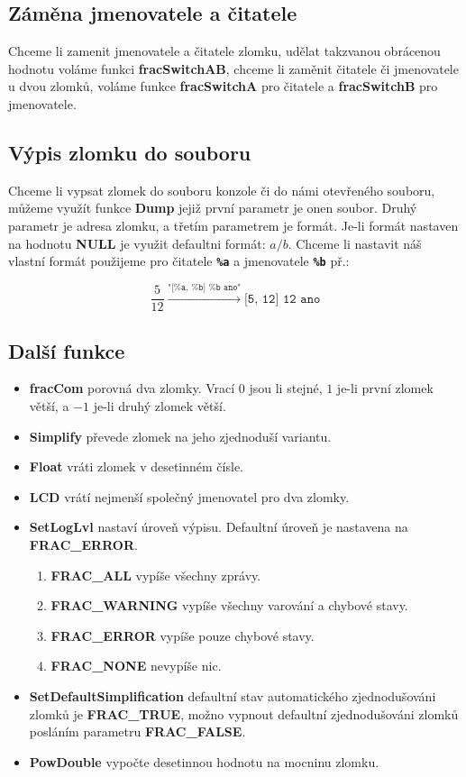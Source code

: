 \documentclass[a4paper, twocolumn, 11pt, twoside]{article}
\begin{document}
\subsection{Záměna jmenovatele a čitatele}
Chceme li zamenit jmenovatele a čitatele zlomku, udělat takzvanou obrácenou hodnotu
voláme funkci \textbf{fracSwitchAB}, chceme li zaměnit čitatele či jmenovatele u dvou zlomků, voláme 
funkce \textbf{fracSwitchA} pro čitatele a \textbf{fracSwitchB} pro jmenovatele.

\subsection{Výpis zlomku do souboru}
Chceme li vypsat zlomek do souboru konzole či do námi otevřeného souboru,
můžeme využít funkce \textbf{Dump} jejiž první parametr je onen soubor.
Druhý parametr je adresa zlomku, a třetím parametrem je formát. Je-li formát nastaven na hodnotu \textbf{NULL} je využit defaultni formát: $a/b$.
Chceme li nastavit náš vlastní formát použijeme pro čitatele \texttt{\textbf{\%a}} a jmenovatele \texttt{\textbf{\%b}} př.:

$$\frac{5}{12} \xrightarrow{\texttt{"[\%a, \%b] \%b ano"}} \texttt{[5, 12] 12 ano}$$

\subsection{Další funkce}
\begin{itemize}
    \item \textbf{fracCom} porovná dva zlomky. Vrací $0$ jsou li stejné, $1$ je-li první zlomek větší, a $-1$ je-li druhý zlomek větší.
    \item \textbf{Simplify} převede zlomek na jeho zjednoduší variantu.
    \item \textbf{Float} vráti zlomek v desetinném čísle.
    \item \textbf{LCD} vrátí nejmenší společný jmenovatel pro dva zlomky.
    \item \textbf{SetLogLvl} nastaví úroveň výpisu.
    Defaultní úroveň je nastavena na \textbf{FRAC\_ERROR}.
    \begin{enumerate} 
        \item \textbf{FRAC\_ALL} vypíše všechny zprávy.
        \item \textbf{FRAC\_WARNING} vypíše všechny varování a chybové stavy.
        \item \textbf{FRAC\_ERROR} vypíše pouze chybové stavy.
        \item \textbf{FRAC\_NONE} nevypíše nic.
    \end{enumerate}
    \item \textbf{SetDefaultSimplification} defaultní stav automatického zjednodušováni zlomků je \textbf{FRAC\_TRUE}, možno vypnout defaultní zjednodušováni zlomků posláním parametru \textbf{FRAC\_FALSE}.
    \item \textbf{PowDouble} vypočte desetinnou hodnotu na mocninu zlomku.

\end{itemize}
\end{document}

